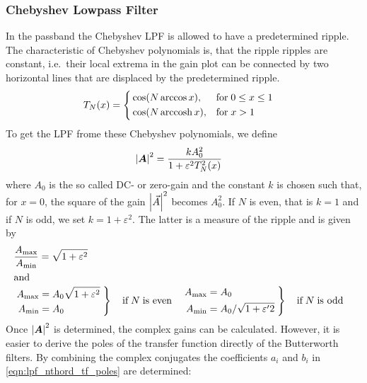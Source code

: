 \subsubsection{Chebyshev Lowpass Filter}
In the passband the Chebyshev \ac{LPF} is allowed to have a predetermined ripple. The characteristic of Chebyshev polynomials is, that the ripple ripples are constant, i.e.\ their local extrema in the gain plot can be connected by two horizontal lines that are displaced by the predetermined ripple.
\begin{align}
  T_N(x) &=\left\{%
    \begin{aligned}
      &\cos(N \arccos x),  &\text{for}\;&0\leq x\leq 1\\
      &\cos(N \arccosh x), &\text{for}\;&x>1
    \end{aligned}
  \right.
\end{align}
To get the \ac{LPF} frome these Chebyshev polynomials, we define
\begin{align}
  \abs{\bm{A}}^2 &= \frac{kA_0^2}{1+\varepsilon^2T_N^2(x)}
\end{align}
where $A_0$ is the so called DC- or zero-gain and the constant $k$ is chosen such that, for $x=0$, the square of the gain $\abs{\vec{A}}^2$ becomes $A_0^2$. If $N$ is even, that is $k=1$ and if $N$ is odd, we set $k=1+\varepsilon^2$. The latter is a measure of the ripple and is given by
\begin{align}
  &\frac{A_{\max}}{A_{\min}} = \sqrt{1+\varepsilon^2}\\
  \intertext{and}
  &\left.\begin{aligned}
    A_{\max} &= A_0\sqrt{1+\varepsilon^2}\;\\
    A_{\min} &= A_0
  \end{aligned}\right\}
  \quad\text{if}\;N\;\text{is even}
  &&\left.\begin{aligned}
    A_{\max} &= A_0\\
    A_{\min} &= A_0/\sqrt{1+\varepsilon'2}\;
  \end{aligned}\right\}
  \quad\text{if}\;N\;\text{is odd}
\end{align}
Once $\abs{\bm{A}}^2$ is determined, the complex gains can be calculated. However, it is easier to derive the poles of the transfer function directly of the Butterworth filters. By combining the complex conjugates the coefficients $a_i$ and $b_i$ in \eqref{eqn:lpf_nthord_tf_poles} are determined:
